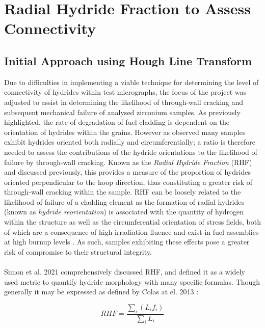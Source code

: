 \documentclass{article}
\begin{document}
\section{Radial Hydride Fraction to Assess Connectivity}
\subsection{Initial Approach using Hough Line Transform}

    Due to difficulties in implementing a viable technique for determining the level of connectivity of hydrides within test micrographs, the focus of the project was adjusted to assist in determining the likelihood of through-wall cracking and subsequent mechanical failure of analysed zirconium samples. As previously highlighted, the rate of degradation of fuel cladding is dependent on the orientation of hydrides within the grains. However as observed many samples exhibit hydrides oriented both radially and circumferentially; a ratio is therefore needed to assess the contributions of the hydride orientations to the likelihood of failure by through-wall cracking. Known as the \textit{Radial Hydride Fraction} (RHF) and discussed previously, this provides a measure of the proportion of hydrides oriented perpendicular to the hoop direction, thus constituting a greater risk of through-wall cracking within the sample. RHF can be loosely related to the likelihood of failure of a cladding element as the formation of radial hydrides (known as \textit{hydride reorientation}) is associated with the quantity of hydrogen within the structure as well as the circumferential orientation of stress fields, both of which are a consequence of high irradiation fluence and exist in fuel assemblies at high burnup levels \cite{Plyasov2020}. As such, samples exhibiting these effects pose a greater risk of compromise to their structural integrity.
    \\
    \\
    Simon et al. 2021 \cite{Simon2021} comprehensively discussed RHF, and defined it as a widely used metric to quantify hydride morphology with many specific formulas. Though generally it may be expressed as defined by Colas at el. 2013 \cite{Colas2013}:
    
    \begin{equation}
        RHF = \frac{\sum_i(L_i f_i)}{\sum_i{L_i}}
        
    \label{equ:RHF}
    \end{equation}
    
\end{document}
